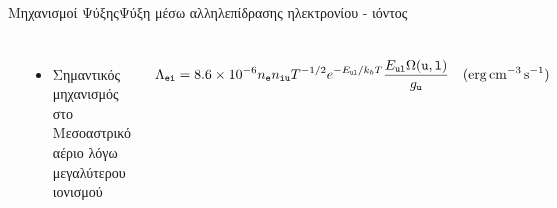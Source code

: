 \documentclass{beamer}
\begin{document}
\begin{frame}{Μηχανισμοί Ψύξης}{Ψύξη μέσω αλληλεπίδρασης ηλεκτρονίου - ιόντος}
	\begin{columns}
\begin{center}
	\includegraphics[height=0.7\textheight]{../Document/Images/eiCoolingFunction}
\end{center}

		\begin{itemize}
			\item{Σημαντικός μηχανισμός στο Μεσοαστρικό αέριο λόγω μεγαλύτερου ιονισμού}
		\end{itemize}
		\begin{equation}
		\Lambda _\mathtt{ei}=\num{8.6e-6} n_\mathtt{e} n_\mathtt{iu}T^{-1/2} e^{-E_\mathtt{ul}/k_b T}\frac{E_\mathtt{ul}\Omega (\mathtt{u,l})}{g_\mathtt{u}} \qq{(\si{erg.cm^{-3}.s^{-1}})} 
		\end{equation}
	\end{columns}
\end{frame}
\end{document}

